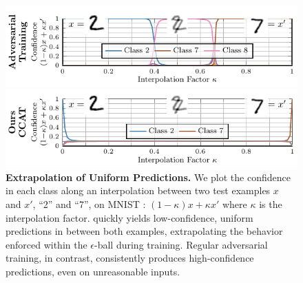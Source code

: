 \begin{figure}[t]
    \vspace*{-8px}
    
    \centering
    \begin{minipage}{0.49\textwidth}
        \hspace*{-0.2cm}
        \includegraphics[width=1\textwidth]{fig_mmnist_advtrain_0_interpolation}
        
        \hspace*{-0.2cm}
        \includegraphics[width=1\textwidth]{fig_mmnist_ours10_0_interpolation}
    \end{minipage}
    \vspace*{-10px}
    
    \caption{\textbf{Extrapolation of Uniform Predictions.} We plot the confidence in each class along an interpolation between two test examples $x$ and $x'$, ``2'' and ``7'', on MNIST \cite{LecunIEEE1998}: $(1 - \kappa)x + \kappa x'$ where $\kappa$ is the interpolation factor. \ConfTrain quickly yields low-confidence, uniform predictions in between both examples, extrapolating the behavior enforced within the $\epsilon$-ball during training. Regular adversarial training, in contrast, consistently produces high-confidence predictions, even on unreasonable inputs.}
    \label{fig:interpolation}
    \vspace*{-2px}
\end{figure}

